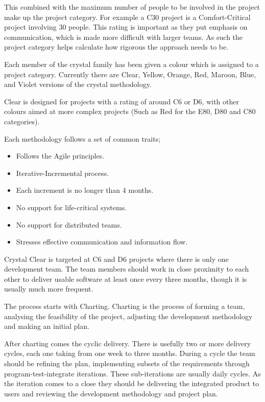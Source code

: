 \documentclass[11pt,a4paper]{article}
\begin{document}
This combined with the maximum number of people to be involved in the project make up the project category. For example a C30 project is a Comfort-Critical project involving 30 people. This rating is important as they put emphasis on communication, which is made more difficult with larger teams. As such the project category helps calculate how rigorous the approach needs to be. 

Each member of the crystal family has been given a colour which is assigned to a project category. Currently there are Clear, Yellow, Orange, Red, Maroon, Blue, and Violet versions of the crystal methodology. 

Clear is designed for projects with a rating of around C6 or D6, with other colours aimed at more complex projects (Such as Red for the E80, D80 and C80 categories). 

Each methodology follows a set of common traits;

\begin{itemize}
\item Follows the Agile principles. 
\item Iterative-Incremental process. 
\item Each increment is no longer than 4 months.
\item No support for life-critical systems.
\item No support for distributed teams. 
\item Stresses effective communication and information flow. 
\end{itemize}

Crystal Clear is targeted at C6 and D6 projects where there is only one development team. The team members should work in close proximity to each other to deliver usable software at least once every three months, though it is usually much more frequent. 

The process starts with Charting. Charting is the process of forming a team, analysing the feasibility of the project, adjusting the development methodology and making an initial plan. 

After charting comes the cyclic delivery. There is usefully two or more delivery cycles, each one taking from one week to three months. During a cycle the team should be refining the plan, implementing subsets of the requirements through program-test-integrate iterations. These sub-iterations are usually daily cycles. As the iteration comes to a close they should be delivering the integrated product to users and reviewing the development methodology and project plan.
\end{document}
